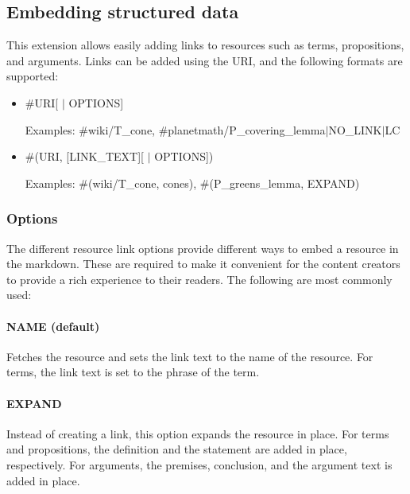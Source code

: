 \documentclass[a4paper]{article}
\begin{document}
\subsection{Embedding structured data}

This extension allows easily adding links to resources such as terms, propositions, and arguments. Links can be added using the URI, and the following formats are supported:


\begin{itemize}

	\item \#URI[ $\vert$ OPTIONS]


	Examples: \#wiki/T\_cone, \#planetmath/P\_covering\_lemma$\vert$NO\_LINK$\vert$LC

	\item \#(URI, [\textquotesingle LINK\_TEXT\textquotesingle][ $\vert$ OPTIONS])

	

	Examples: \#(wiki/T\_cone, \textquotesingle cones\textquotesingle), \#(P\_greens\_lemma, EXPAND)

\end{itemize}



\subsubsection{Options}

The different resource link options provide different ways to embed a resource in the markdown. These are required to make it convenient for the content creators to provide a rich experience to their readers. The following are most commonly used:


\paragraph{NAME (default)}

Fetches the resource and sets the link text to the name of the resource. For terms, the link text is set to the phrase of the term.


\paragraph{EXPAND}

Instead of creating a link, this option expands the resource in place. For terms and propositions, the definition and the statement are added in place, respectively. For arguments, the premises, conclusion, and the argument text is added in place.
\end{document}
